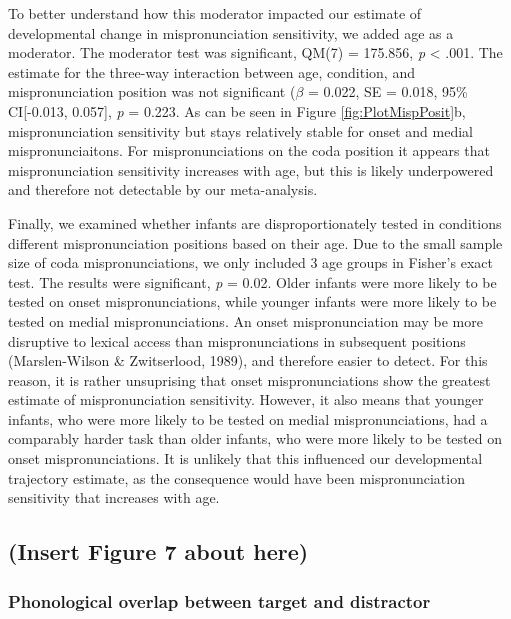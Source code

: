 \documentclass[man]{apa6}
\begin{document}
To better understand how this moderator impacted our estimate of developmental change in mispronunciation sensitivity, we added age as a moderator. The moderator test was significant, QM(7) = 175.856, \emph{p} \textless{} .001. The estimate for the three-way interaction between age, condition, and mispronunciation position was not significant (\(\beta\) = 0.022, SE = 0.018, 95\% CI{[}-0.013, 0.057{]}, \emph{p} = 0.223. As can be seen in Figure \ref{fig:PlotMispPosit}b, mispronunciation sensitivity but stays relatively stable for onset and medial mispronunciaitons. For mispronunciations on the coda position it appears that mispronunciation sensitivity increases with age, but this is likely underpowered and therefore not detectable by our meta-analysis.

Finally, we examined whether infants are disproportionately tested in conditions different mispronunciation positions based on their age. Due to the small sample size of coda mispronunciations, we only included 3 age groups in Fisher's exact test. The results were significant, \emph{p} = 0.02. Older infants were more likely to be tested on onset mispronunciations, while younger infants were more likely to be tested on medial mispronunciations. An onset mispronunciation may be more disruptive to lexical access than mispronunciations in subsequent positions (Marslen-Wilson \& Zwitserlood, 1989), and therefore easier to detect. For this reason, it is rather unsuprising that onset mispronunciations show the greatest estimate of mispronunciation sensitivity. However, it also means that younger infants, who were more likely to be tested on medial mispronunciations, had a comparably harder task than older infants, who were more likely to be tested on onset mispronunciations. It is unlikely that this influenced our developmental trajectory estimate, as the consequence would have been mispronunciation sensitivity that increases with age.

\hypertarget{insert-figure-7-about-here}{%
\subsection{(Insert Figure 7 about here)}\label{insert-figure-7-about-here}}

\hypertarget{phonological-overlap-between-target-and-distractor}{%
\subsubsection{Phonological overlap between target and distractor}\label{phonological-overlap-between-target-and-distractor}}
\end{document}
